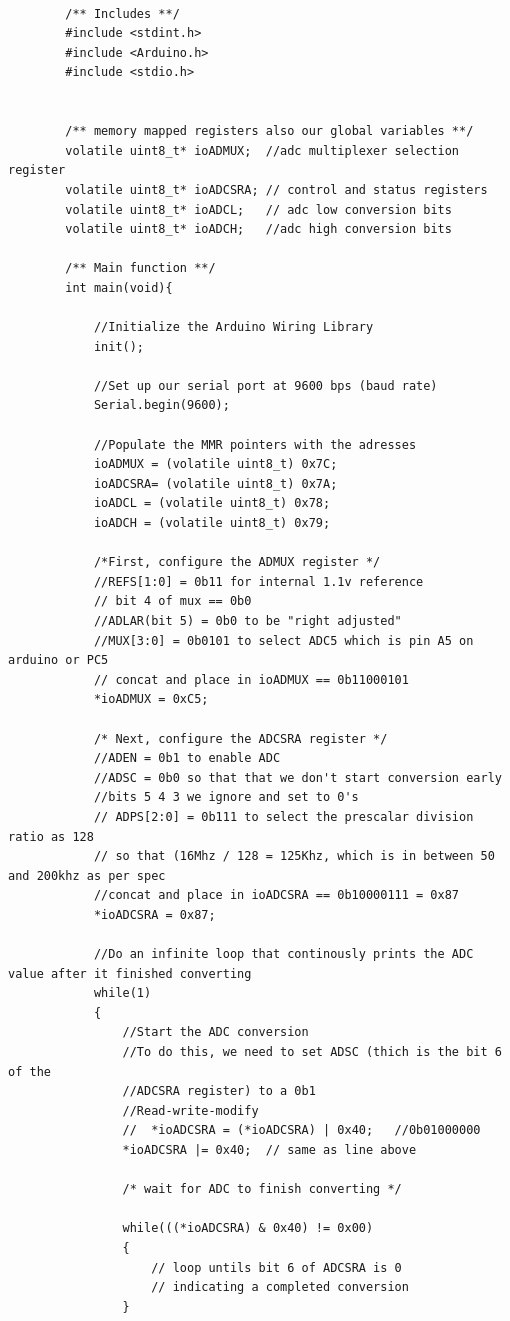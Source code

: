\documentclass[11pt,pdftex,portrait,letterpaper]{article}
\begin{document}
	\begin{lstlisting}[caption={Program 2}, label=l:programx]
		
		/** Includes **/
		#include <stdint.h>
		#include <Arduino.h>
		#include <stdio.h>
		
		
		/** memory mapped registers also our global variables **/
		volatile uint8_t* ioADMUX;  //adc multiplexer selection register
		volatile uint8_t* ioADCSRA; // control and status registers
		volatile uint8_t* ioADCL;   // adc low conversion bits
		volatile uint8_t* ioADCH;   //adc high conversion bits
		
		/** Main function **/
		int main(void){
			
			//Initialize the Arduino Wiring Library
			init();
			
			//Set up our serial port at 9600 bps (baud rate)
			Serial.begin(9600);
			
			//Populate the MMR pointers with the adresses
			ioADMUX = (volatile uint8_t) 0x7C;
			ioADCSRA= (volatile uint8_t) 0x7A;
			ioADCL = (volatile uint8_t) 0x78;
			ioADCH = (volatile uint8_t) 0x79;
			
			/*First, configure the ADMUX register */
			//REFS[1:0] = 0b11 for internal 1.1v reference
			// bit 4 of mux == 0b0
			//ADLAR(bit 5) = 0b0 to be "right adjusted"
			//MUX[3:0] = 0b0101 to select ADC5 which is pin A5 on arduino or PC5
			// concat and place in ioADMUX == 0b11000101
			*ioADMUX = 0xC5;
			
			/* Next, configure the ADCSRA register */
			//ADEN = 0b1 to enable ADC
			//ADSC = 0b0 so that that we don't start conversion early
			//bits 5 4 3 we ignore and set to 0's
			// ADPS[2:0] = 0b111 to select the prescalar division ratio as 128
			// so that (16Mhz / 128 = 125Khz, which is in between 50 and 200khz as per spec
			//concat and place in ioADCSRA == 0b10000111 = 0x87
			*ioADCSRA = 0x87;
			
			//Do an infinite loop that continously prints the ADC value after it finished converting
			while(1)
			{
				//Start the ADC conversion
				//To do this, we need to set ADSC (thich is the bit 6 of the
				//ADCSRA register) to a 0b1
				//Read-write-modify
				//  *ioADCSRA = (*ioADCSRA) | 0x40;   //0b01000000
				*ioADCSRA |= 0x40;  // same as line above
				
				/* wait for ADC to finish converting */
				
				while(((*ioADCSRA) & 0x40) != 0x00)
				{
					// loop untils bit 6 of ADCSRA is 0 
					// indicating a completed conversion
				}
				

\end{lstlisting}
\end{document}
